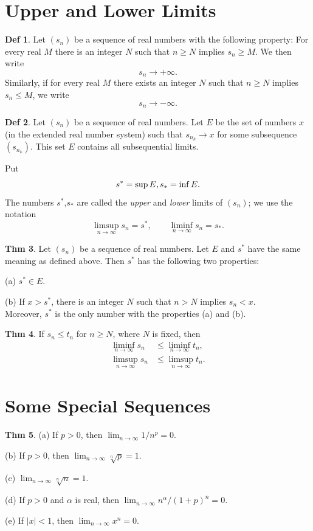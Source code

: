 \documentclass{article}
\theoremstyle{definition}
\newtheorem{definition}{Def}
\newtheorem{theorem}[definition]{Thm}
\begin{document}
\section{Upper and Lower Limits}
\begin{definition}
    Let $(s_n)$ be a sequence of real numbers with the following property: For every real $M$ there is an integer $N$ such that $n\geq N$ implies $s_n\geq M$. We then write
    \[
    s_n\to+\infty.
    \]
    Similarly, if for every real $M$ there exists an integer $N$ such that $n\geq N$ implies $s_n\leq M$, we write
    \[
    s_n\to-\infty.
    \]
\end{definition}
\begin{definition}
    Let $(s_n)$ be a sequence of real numbers. Let $E$ be the set of numbers $x$ (in the extended real number system) such that $s_{n_k}\to x$ for some subsequence $(s_{n_k})$. This set $E$ contains all subsequential limits.\par
    Put
    \[
    s^*=\sup E,\\
    s_*=\inf E.
    \]
    The numbers $s^*$,$s_*$ are called the \textit{upper} and \textit{lower} limits of $(s_n)$; we use the notation
    \[
    \limsup_{n\to\infty} s_n=s^*,\qquad \liminf_{n\to\infty}s_n=s_*.
    \]
\end{definition}
\begin{theorem}
    Let $(s_n)$ be a sequence of real numbers. Let $E$ and $s^*$ have the same meaning as defined above. Then $s^*$ has the following two properties:\par
    (a) $s^*\in E$.\par
    (b) If $x>s^*$, there is an integer $N$ such that $n>N$ implies $s_n<x$.\\
    Moreover, $s^*$ is the only number with the properties (a) and (b).
\end{theorem}
\begin{theorem}
    If $s_n\leq t_n$ for $n\geq N$, where $N$ is fixed, then
    \[
    \begin{aligned}
        \liminf_{n\to\infty}s_n&\leq \liminf_{n\to\infty}t_n,\\
        \limsup_{n\to\infty}s_n&\leq \limsup_{n\to\infty}t_n.
    \end{aligned}
    \]
\end{theorem}

\section{Some Special Sequences}
\begin{theorem}
    \leavevmode\par
    (a) If $p>0$, then $\lim_{n\to\infty}1/n^p=0$.\par
    (b) If $p>0$, then $\lim_{n\to\infty}\sqrt[n]{p}=1$.\par
    (c) $\lim_{n\to\infty}\sqrt[n]{n}=1$.\par
    (d) If $p>0$ and $\alpha$ is real, then $\lim_{n\to\infty}n^\alpha/(1+p)^n=0$.\par
    (e) If $|x|<1$, then $\lim_{n\to\infty}x^n=0$.
\end{theorem}
\end{document}
